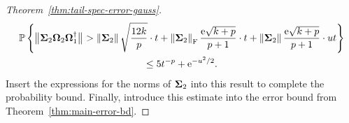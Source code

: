 \documentclass[final]{siamltex}
\begin{document}
\begin{proof}[Theorem~\ref{thm:tail-spec-error-gauss}]
\begin{multline*}
\mathbb{P}\left\{ { {\bigl\Vert {\bm{\Sigma}_2\bm{\Omega}_2\bm{\Omega}_1^\dagger} \bigr\Vert}_{}
    > \left\Vert {\bm{\Sigma}_2} \right\Vert \sqrt{\frac{12k}{p}} \cdot t
    + \left\Vert {\bm{\Sigma}_2} \right\Vert_{\mathrm{F}} \frac{\mathrm{e}\sqrt{k+p}}{p+1} \cdot t
    + \left\Vert {\bm{\Sigma}_2} \right\Vert \frac{\mathrm{e}\sqrt{k+p}}{p+1} \cdot ut } \right\} \\
    \leq 5 t^{-p} + \mathrm{e}^{-u^2/2}.
\end{multline*}
Insert the expressions for the norms of $\bm{\Sigma}_2$ into this result to complete
the probability bound.  Finally, introduce this estimate into the error bound from
Theorem~\ref{thm:main-error-bd}.
\end{proof}



\end{document}
